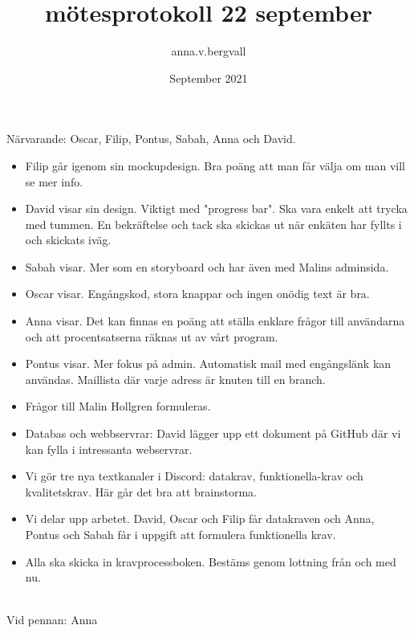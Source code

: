 \documentclass{article}
\title{mötesprotokoll 22 september}
\author{anna.v.bergvall }
\date{September 2021}
\begin{document}
\maketitle


Närvarande: Oscar, Filip, Pontus, Sabah, Anna och David.


\begin{itemize}
    \item Filip går igenom sin mockupdesign. Bra poäng att man får välja om man vill se mer info.
    \item David visar sin design. Viktigt med "progress bar". Ska vara enkelt att trycka med tummen. En bekräftelse och tack ska skickas ut när enkäten har fyllts i och skickats iväg. 
    \item Sabah visar. Mer som en storyboard och har även med Malins adminsida. 
    \item Oscar visar. Engångskod, stora knappar och ingen onödig text är bra.
    \item Anna visar. Det kan finnas en poäng att ställa enklare frågor till användarna och att procentsatserna räknas ut av vårt program. 
    \item Pontus visar. Mer fokus på admin. Automatisk mail med engångslänk kan användas. Maillista där varje adress är knuten till en branch.
    \item Frågor till Malin Hollgren formuleras.
    \item Databas och webbservrar: David lägger upp ett dokument på GitHub där vi kan fylla i intressanta webservrar.
    \item Vi gör tre nya textkanaler i Discord: datakrav, funktionella-krav och kvalitetskrav. Här går det bra att brainstorma.
    \item Vi delar upp arbetet. David, Oscar och Filip får datakraven och Anna, Pontus och Sabah får i uppgift att formulera funktionella krav. 
    \item Alla ska skicka in kravprocessboken. Bestäms genom lottning från och med nu.
\end{itemize}
    \\
    
    Vid pennan: Anna
\end{document}
